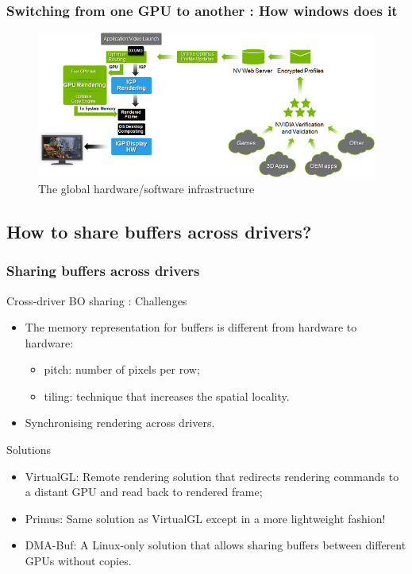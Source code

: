 \documentclass[11pt,english,compress]{beamer}
\begin{document}
\begin{frame}
	\frametitle{Switching from one GPU to another : How windows does it}

	\begin{figure}[h]
		\centering
		\includegraphics[width=1\linewidth]{imgs/optimus_arch.png}
		\caption{The global hardware/software infrastructure}
	\end{figure}
\end{frame}

\subsection{How to share buffers across drivers?}

\begin{frame}
	\frametitle{Sharing buffers across drivers}

	\begin{block}{Cross-driver BO sharing : Challenges}
		\begin{itemize}
			\item The memory representation for buffers is different from hardware to hardware:
			\begin{itemize}
				\item pitch: number of pixels per row;
				\item tiling: technique that increases the spatial locality.
			\end{itemize}
			\item Synchronising rendering across drivers.
		\end{itemize}
	\end{block}

	\begin{block}{Solutions}
		\begin{itemize}
			\item VirtualGL: Remote rendering solution that redirects rendering commands to a distant GPU and read back to rendered frame;
			\item Primus: Same solution as VirtualGL except in a more lightweight fashion!
			\item DMA-Buf: A Linux-only solution that allows sharing buffers between different GPUs without copies.
		\end{itemize}
	\end{block}
\end{frame}
\end{document}
